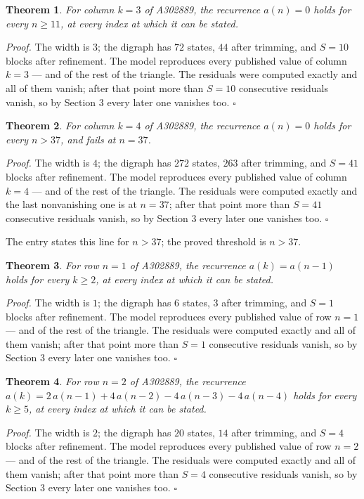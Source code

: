 \documentclass[11pt]{article}
\newtheorem{theorem}{Theorem}
\theoremstyle{definition}
\begin{document}
\begin{theorem} For column $k = 3$ of A302889, the recurrence $a(n) = 0$ holds for every $n \ge 11$, at every index at which it can be stated.\end{theorem}

{\itshape Proof.} The width is $3$; the digraph has $72$ states, $44$ after trimming, and $S = 10$ blocks after refinement. The model reproduces every published value of column $k = 3$ --- and of the rest of the triangle. The residuals were computed exactly and all of them vanish; after that point more than $S = 10$ consecutive residuals vanish, so by Section 3 every later one vanishes too. $\square$

\begin{theorem} For column $k = 4$ of A302889, the recurrence $a(n) = 0$ holds for every $n > 37$, and fails at $n = 37$.\end{theorem}

{\itshape Proof.} The width is $4$; the digraph has $272$ states, $263$ after trimming, and $S = 41$ blocks after refinement. The model reproduces every published value of column $k = 4$ --- and of the rest of the triangle. The residuals were computed exactly and the last nonvanishing one is at $n = 37$; after that point more than $S = 41$ consecutive residuals vanish, so by Section 3 every later one vanishes too. $\square$

The entry states this line for $n > 37$; the proved threshold is $n > 37$.

\begin{theorem} For row $n = 1$ of A302889, the recurrence $a(k) = a(n-1)$ holds for every $k \ge 2$, at every index at which it can be stated.\end{theorem}

{\itshape Proof.} The width is $1$; the digraph has $6$ states, $3$ after trimming, and $S = 1$ blocks after refinement. The model reproduces every published value of row $n = 1$ --- and of the rest of the triangle. The residuals were computed exactly and all of them vanish; after that point more than $S = 1$ consecutive residuals vanish, so by Section 3 every later one vanishes too. $\square$

\begin{theorem} For row $n = 2$ of A302889, the recurrence $a(k) = 2\,a(n-1) + 4\,a(n-2) - 4\,a(n-3) - 4\,a(n-4)$ holds for every $k \ge 5$, at every index at which it can be stated.\end{theorem}

{\itshape Proof.} The width is $2$; the digraph has $20$ states, $14$ after trimming, and $S = 4$ blocks after refinement. The model reproduces every published value of row $n = 2$ --- and of the rest of the triangle. The residuals were computed exactly and all of them vanish; after that point more than $S = 4$ consecutive residuals vanish, so by Section 3 every later one vanishes too. $\square$
\end{document}
